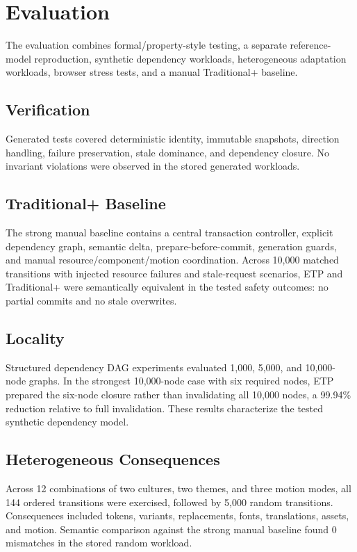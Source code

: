 \documentclass[manuscript]{acmart}
\begin{document}
\section{Evaluation}
The evaluation combines formal/property-style testing, a separate reference-model
reproduction, synthetic dependency workloads, heterogeneous adaptation workloads, browser
stress tests, and a manual Traditional+ baseline.

\subsection{Verification}
Generated tests covered deterministic identity, immutable snapshots, direction handling,
failure preservation, stale dominance, and dependency closure. No invariant violations
were observed in the stored generated workloads.

\subsection{Traditional+ Baseline}
The strong manual baseline contains a central transaction controller, explicit dependency
graph, semantic delta, prepare-before-commit, generation guards, and manual
resource/component/motion coordination. Across 10,000 matched transitions with injected
resource failures and stale-request scenarios, ETP and Traditional+ were semantically
equivalent in the tested safety outcomes: no partial commits and no stale overwrites.

\subsection{Locality}
Structured dependency DAG experiments evaluated 1,000, 5,000, and 10,000-node graphs.
In the strongest 10,000-node case with six required nodes, ETP prepared the six-node closure
rather than invalidating all 10,000 nodes, a 99.94\% reduction relative to full invalidation.
These results characterize the tested synthetic dependency model.

\subsection{Heterogeneous Consequences}
Across 12 combinations of two cultures, two themes, and three motion modes, all 144 ordered
transitions were exercised, followed by 5,000 random transitions. Consequences included
tokens, variants, replacements, fonts, translations, assets, and motion. Semantic comparison
against the strong manual baseline found 0 mismatches in the stored random workload.
\end{document}
